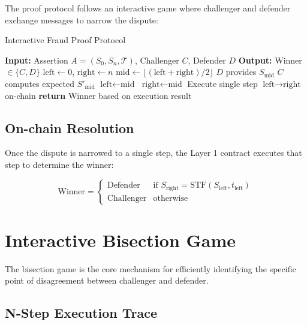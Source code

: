 \documentclass[11pt,a4paper]{article}
\theoremstyle{definition}
\begin{document}
The proof protocol follows an interactive game where challenger and defender exchange messages to narrow the dispute:

\begin{algorithm}
\caption{Interactive Fraud Proof Protocol}
\begin{algorithmic}[1]
\State \textbf{Input:} Assertion $A = (S_0, S_n, \mathcal{T})$, Challenger $C$, Defender $D$
\State \textbf{Output:} Winner $\in \{C, D\}$
\State $\text{left} \gets 0$, $\text{right} \gets n$
    \State $\text{mid} \gets \lfloor(\text{left} + \text{right})/2\rfloor$
    \State $D$ provides $S_{\text{mid}}$
    \State $C$ computes expected $S'_{\text{mid}}$
        \State $\text{left} \gets \text{mid}$ 
    \Else
        \State $\text{right} \gets \text{mid}$ 
    \EndIf
\EndWhile
\State Execute single step $\text{left} \rightarrow \text{right}$ on-chain
\State \textbf{return} Winner based on execution result
\end{algorithmic}
\end{algorithm}

\subsection{On-chain Resolution}

Once the dispute is narrowed to a single step, the Layer 1 contract executes that step to determine the winner:

\begin{equation}
\text{Winner} = \begin{cases}
\text{Defender} & \text{if } S_{\text{right}} = \text{STF}(S_{\text{left}}, t_{\text{left}}) \\
\text{Challenger} & \text{otherwise}
\end{cases}
\end{equation}

\section{Interactive Bisection Game}

The bisection game is the core mechanism for efficiently identifying the specific point of disagreement between challenger and defender.

\subsection{N-Step Execution Trace}
\end{document}
